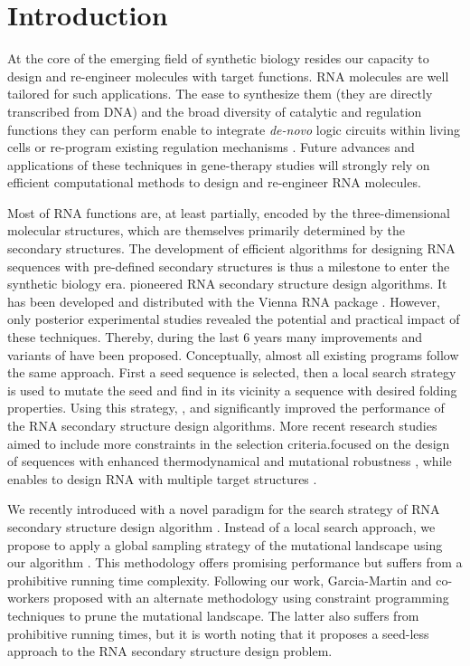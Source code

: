 \section{Introduction}
\label{sec:introduction}

At the core of the emerging field of synthetic biology resides our capacity to design and re-engineer molecules with target functions. RNA molecules are well tailored for such applications. The ease to synthesize them (they are directly transcribed from DNA) and the broad diversity of catalytic and regulation functions they can perform enable to integrate \textit{de-novo} logic  circuits within living cells \cite{Rodrigo:2012fk} or re-program existing regulation mechanisms \cite{Chang:2012uq}. Future advances and applications of these techniques in gene-therapy studies will strongly rely on efficient computational methods to design and re-engineer RNA molecules.

Most of RNA functions are, at least partially, encoded by the three-dimensional molecular structures, which are themselves primarily determined by the secondary structures. The development of efficient algorithms for designing RNA sequences with pre-defined secondary structures is thus a milestone to enter the synthetic biology era. \RNAinverse pioneered RNA secondary structure design algorithms. It has been developed and distributed with the Vienna RNA package \cite{Hofacker:1994}. However, only posterior experimental studies revealed the potential and practical impact of these techniques. Thereby, during the last 6 years many improvements and variants of \RNAinverse have been proposed. Conceptually, almost all existing programs follow the same approach. First a seed sequence is selected, then a local search strategy is used to mutate the seed and find in its vicinity a sequence with desired folding properties. Using this strategy, \INFORNA \cite{Busch:2006uq}, \RNASSD \cite{Aguirre-Hernandez:2007kx} and \NUPACK \cite{Zadeh:2011fk} significantly improved the performance of the RNA secondary structure design algorithms. More recent research studies aimed to include more constraints in the selection criteria.\RNAexinv focused on the design of sequences with enhanced thermodynamical and mutational robustness \cite{Avihoo:2011fk}, while \frankenstein enables to design RNA with multiple target structures \cite{Lyngso:2012vn}.

We recently introduced with \RNAensign a novel paradigm for the search strategy of RNA secondary structure design algorithm \cite{Levin:2012kx}. Instead of a local search approach, we propose to apply a global sampling strategy of the mutational landscape using our \RNAmutants algorithm \cite{Waldispuhl2008}. This methodology offers promising performance but  suffers from a prohibitive running time complexity. Following our work, Garcia-Martin and co-workers proposed with \RNAiFOLD an alternate methodology using constraint programming techniques to prune the mutational landscape. The latter also suffers from prohibitive running times, but it is worth noting that it proposes a seed-less approach to the RNA secondary structure design problem.

